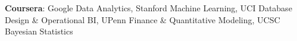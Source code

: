 \textbf{Coursera}: Google Data Analytics, Stanford Machine Learning, UCI Database Design \& Operational BI, UPenn Finance \& Quantitative Modeling, UCSC Bayesian Statistics 
